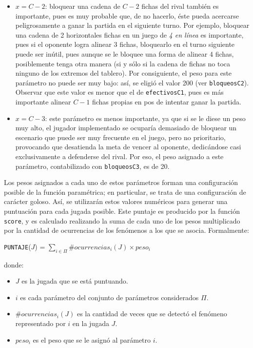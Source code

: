 \documentclass[12pt,a4paper]{article}
\begin{document}
\begin{itemize}
\begin{itemize}
                \item $x = C-2$: bloquear una cadena de $C-2$ fichas del rival también es importante, pues es muy probable que, de no hacerlo, éste pueda acercarse peligrosamente a ganar la partida en el siguiente turno. Por ejemplo, bloquear una cadena de 2 horizontales fichas en un juego de \textit{4 en línea} es importante, pues si el oponente logra alinear 3 fichas, bloquearlo en el turno siguiente puede ser inútil, pues aunque se le bloquee una forma de alinear 4 fichas, posiblemente tenga otra manera (si y sólo si la cadena de fichas no toca ninguno de los extremos del tablero). Por consiguiente, el peso para este parámetro no puede ser muy bajo: así, se eligió el valor 200 (ver \texttt{bloqueosC2}). Observar que este valor es menor que el de \texttt{efectivosC1}, pues es más importante alinear $C-1$ fichas propias en pos de intentar ganar la partida.
                \item $x = C-3$: este parámetro es menos importante, ya que si se le diese un peso muy alto, el jugador implementado se ocuparía demasiado de bloquear un escenario que puede ser muy frecuente en el juego, pero no prioritario, provocando que desatienda la meta de vencer al oponente, dedicándose casi exclusivamente a defenderse del rival. Por eso, el peso asignado a este parámetro, contabilizado con \texttt{bloqueosC3}, es de 20.
            \end{itemize}
    \end{itemize}
    
    Los pesos asignados a cada uno de estos parámetros forman una configuración posible de la función paramétrica; en particular, se trata de una configuración de carácter goloso. Así, se utilizarán estos valores numéricos para generar una puntuación para cada jugada posible. Este puntaje es producido por la función \texttt{score}, y es calculado realizando la suma de cada uno de los pesos multiplicado por la cantidad de ocurrencias de los fenómenos a los que se asocia. Formalmente:
    
    \begin{center}
        \texttt{PUNTAJE}($J$) =  $\sum_{i \in \Pi} \#ocurrencias_{i}(J) \times peso_{i} $ 
    \end{center}
    
    donde:
    \begin{itemize}
        \item $J$ es la jugada que se está puntuando.
        \item $i$ es cada parámetro del conjunto de parámetros considerados $\Pi$.
        \item $\#ocurrencias_{i}(J)$ es la cantidad de veces que se detectó el fenómeno representado por $i$ en la jugada $J$.
        \item $peso_{i}$ es el peso que se le asignó al parámetro $i$.
    \end{itemize}
    
\end{document}

